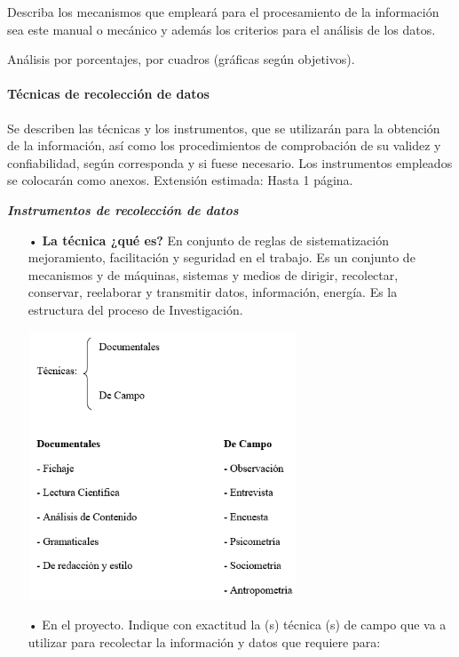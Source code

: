 \documentclass[12pt, a4paper, nofontenc, numbers=endperiod]{apa7}
\begin{document}
{\setlength{\parindent}{1.27cm}Describa los mecanismos que empleará para el procesamiento de la información sea este manual o mecánico y además los criterios para el análisis de los datos.

\setlength{\parindent}{1.27cm}Análisis por porcentajes, por cuadros (gráficas según objetivos).	

\setlength{\parindent}{1.27cm}\paragraph{Técnicas de recolección de datos}Se describen las técnicas y los instrumentos, que se utilizarán para la obtención de la información, así como los procedimientos de comprobación de  su validez y confiabilidad, según corresponda y si fuese necesario. Los instrumentos empleados se colocarán como anexos. Extensión estimada: Hasta 1 página.

\setlength{\parindent}{2.5cm}\textit{\textbf{Instrumentos de recolección de datos}}
{\doublespacing
\begin{itemize}[leftmargin=2.90cm]
\item[•] \textbf{La técnica ¿qué es?} En conjunto de reglas de sistematización mejoramiento, facilitación y seguridad en el trabajo. Es un conjunto de mecanismos y de máquinas, sistemas y medios de dirigir, recolectar, conservar, reelaborar y transmitir datos, información, energía. Es la estructura del proceso de Investigación.

\begin{center}
	\includegraphics[width=8cm,height=8cm]{Imagenes/Figura39}
\end{center}

\item[•] En el proyecto. Indique con exactitud la (s) técnica (s) de campo que va a utilizar para recolectar la información y datos que requiere para:


\end{itemize}}}
\end{document}
